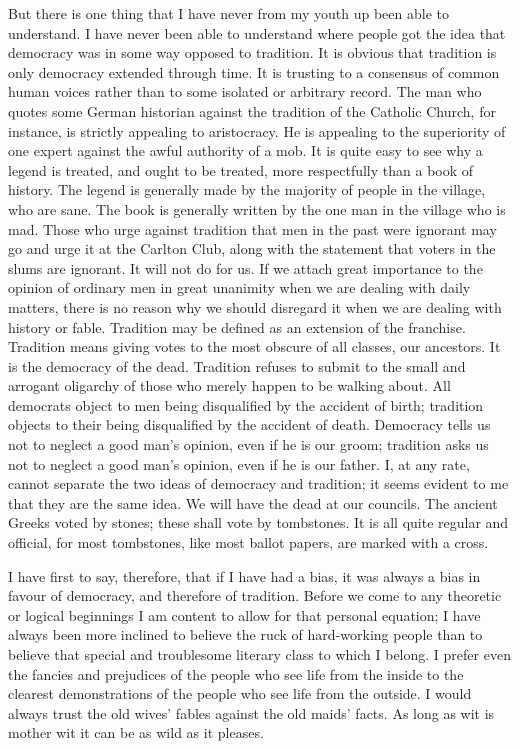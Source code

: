 But there is one thing that I have never from my youth up been able to understand. I have never been able to understand where people got the idea that democracy was in some way opposed to tradition. It is obvious that tradition is only democracy extended through time. It is trusting to a consensus of common human voices rather than to some isolated or arbitrary record. The man who quotes some German historian against the tradition of the Catholic Church, for instance, is strictly appealing to aristocracy. He is appealing to the superiority of one expert against the awful authority of a mob. It is quite easy to see why a legend is treated, and ought to be treated, more respectfully than a book of history. The legend is generally made by the majority of people in the village, who are sane. The book is generally written by the one man in the village who is mad. Those who urge against tradition that men in the past were ignorant may go and urge it at the Carlton Club, along with the statement that voters in the slums are ignorant. It will not do for us. If we attach great importance to the opinion of ordinary men in great unanimity when we are dealing with daily matters, there is no reason why we should disregard it when we are dealing with history or fable. Tradition may be defined as an extension of the franchise. Tradition means giving votes to the most obscure of all classes, our ancestors. It is the democracy of the dead. Tradition refuses to submit to the small and arrogant oligarchy of those who merely happen to be walking about. All democrats object to men being disqualified by the accident of birth; tradition objects to their being disqualified by the accident of death. Democracy tells us not to neglect a good man’s opinion, even if he is our groom; tradition asks us not to neglect a good man’s opinion, even if he is our father. I, at any rate, cannot separate the two ideas of democracy and tradition; it seems evident to me that they are the same idea. We will have the dead at our councils. The ancient Greeks voted by stones; these shall vote by tombstones. It is all quite regular and official, for most tombstones, like most ballot papers, are marked with a cross.

I have first to say, therefore, that if I have had a bias, it was always a bias in favour of democracy, and therefore of tradition. Before we come to any theoretic or logical beginnings I am content to allow for that personal equation; I have always been more inclined to believe the ruck of hard-working people than to believe that special and troublesome literary class to which I belong. I prefer even the fancies and prejudices of the people who see life from the inside to the clearest demonstrations of the people who see life from the outside. I would always trust the old wives’ fables against the old maids’ facts. As long as wit is mother wit it can be as wild as it pleases.

